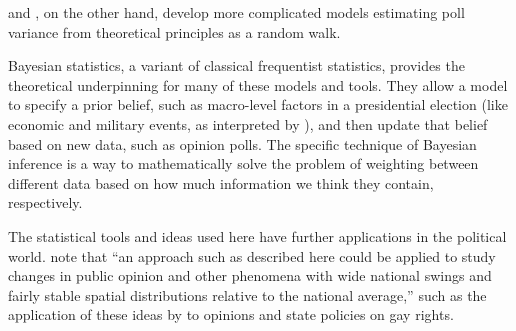 \documentclass[thesis.tex]{subfiles}
\begin{document}
\citet{Strauss:2007aa} and \citet{Jackman:2005aa}, on the other hand, develop more complicated models estimating poll variance from theoretical principles as a random walk.

Bayesian statistics, a variant of classical frequentist statistics, provides the theoretical underpinning for many of these models and tools. They allow a model to specify a prior belief, such as macro-level factors in a presidential election (like economic and military events, as interpreted by \citealt{Hibbs:2008aa}), and then update that belief based on new data, such as opinion polls. The specific technique of Bayesian inference is a way to mathematically solve the problem of weighting between different data based on how much information we think they contain, respectively.

The statistical tools and ideas used here have further applications in the political world. \citet{Lock:2010aa} note that ``an approach such as described here could be applied to study changes in public opinion and other phenomena with wide national swings and fairly stable spatial distributions relative to the national average,'' such as the application of these ideas by \citet{Lax:2009aa} to opinions and state policies on gay rights.

\begin{comment}

Other models incorporate more arcane techniques to, for example, examine voting turnout among demographic groups \citep{Ghitza:2013aa}, an important piece of information for political campaigns.

\textbf{How does it work?} Basic information ahead of time (what's the economy like? How many people are dying?) Incorporate opinion polls. Estimate state outcomes (the electoral college).

\end{comment}
\end{document}
